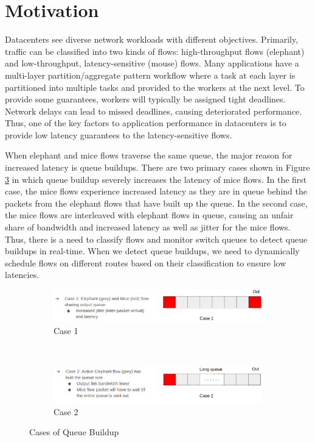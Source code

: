 \section{Motivation}
Datacenters see diverse network workloads with different objectives. Primarily, traffic can be classified into two kinds of flows: high-throughput flows (elephant) and low-throughput, latency-sensitive (mouse) flows. Many applications have a multi-layer partition/aggregate pattern workflow where a task at each layer is partitioned into multiple tasks and provided to the workers at the next level. To provide some guarantees, workers will typically be assigned tight deadlines. Network delays can lead to missed deadlines, causing deteriorated performance. Thus,
one of the key factors to application performance in datacenters is to provide low latency guarantees to the latency-sensitive flows.
 
When elephant and mice flows traverse the same queue, the major reason for increased latency is queue buildups. There are two primary cases shown in Figure \ref{fig:cases} in which queue buildup severely increases the latency of mice flows. In the first case, the mice flows experience increased latency as they are in queue behind the packets from the elephant flows that have built up the queue. In the second case,  the mice flows are interleaved with elephant flows in queue, causing an unfair share of bandwidth and increased latency as well as jitter for the mice flows. Thus, there is a need to classify flows and monitor switch queues to detect queue buildups in real-time. When we detect queue buildups, we need to dynamically schedule flows on different routes based on their classification to ensure low latencies. 

\begin{figure}[H]
\centering
\begin{subfigure}{.55\textwidth}
  \centering
  \includegraphics[width=.8\linewidth]{case1}
  \caption{Case 1}
  \label{fig:case1}
\end{subfigure}%
\\
\begin{subfigure}{.55\textwidth}
  \centering
  \includegraphics[width=.8\linewidth]{case2}
  \caption{Case 2 }
  \label{fig:case2}
\end{subfigure}
\caption{Cases of Queue Buildup}
\label{fig:cases}
\end{figure}


